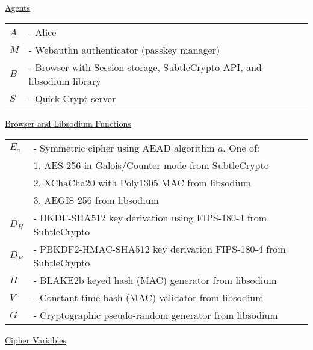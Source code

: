 \documentclass{article}
\begin{document}
\underline{Agents}\\

\begin{tabular}{@{}p{2mm} l}
$A$ & \textrm{ - Alice} \\
$M$ & \textrm{ - Webauthn authenticator (passkey manager)} \\
$B$ & \textrm{ - Browser with Session storage, SubtleCrypto API, and libsodium library} \\
$S$ & \textrm{ - Quick Crypt server} \\
\end{tabular}
      
\hfill \break


\underline{Browser and Libsodium Functions}\\

\begin{tabular}{@{}p{2mm} l}
$E_a$ & \textrm{ - Symmetric cipher using AEAD algorithm }$a$\textrm{. One of:}\\
& \hspace{23pt}\textrm{1. AES-256 in Galois/Counter mode from SubtleCrypto} \\
& \hspace{23pt}\textrm{2. XChaCha20 with Poly1305 MAC from libsodium} \\
& \hspace{23pt}\textrm{3. AEGIS 256 from libsodium} \\
$D_H$ & \textrm{ - HKDF-SHA512 key derivation using FIPS-180-4 from SubtleCrypto} \\
$D_P$ & \textrm{ - PBKDF2-HMAC-SHA512 key derivation FIPS-180-4 from SubtleCrypto} \\
$H$ & \textrm{ - BLAKE2b keyed hash (MAC) generator from libsodium} \\
$V$ & \textrm{ - Constant-time hash (MAC) validator from libsodium} \\
$G$ & \textrm{ - Cryptographic pseudo-random generator from libsodium} \\
\end{tabular}

\hfill \break

\underline{Cipher Variables}\\
\end{document}
